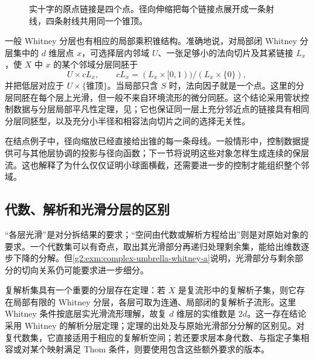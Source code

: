 \begin{figure}[htbp]
	\centering
	
	\caption{实十字的原点链接是四个点。径向伸缩把每个链接点展开成一条射线，四条射线共用同一个锥顶。}
	\label{g2:fig:cross-link}
\end{figure}

一般 Whitney 分层也有相应的局部乘积锥结构。准确地说，对局部闭 Whitney 分层集中的 \(d\) 维层点 \(x\)，可选择层内邻域 \(U\)、一张足够小的法向切片及其紧链接 \(L_x\)，使 \(X\) 中 \(x\) 的某个邻域分层同胚于
\[
	U\times cL_x,\qquad
	cL_x=(L_x\times[0,1))/(L_x\times\{0\}),
\]
并把低层对应于 \(U\times\{\text{锥顶}\}\)。当局部只含 \(S\) 时，法向因子就是一个点。这里的分层同胚在每个层上光滑，但一般不来自环境流形的微分同胚。这个结论采用管状控制数据与分层局部平凡性定理，见\cite[第7节及第10节的管邻域局部平凡性]{Mather2012TopologicalStability}；它也保证同一层上充分邻近点的链接具有相同分层同胚型，以及充分小半径和相容法向切片之间的选择无关性。

\ProseParagraphBreak

在结点例子中，径向缩放已经直接给出锥的每一条母线。一般情形中，控制数据提供可与其他层协调的投影与径向函数；下一节将说明这些对象怎样生成连续的保层流。这也解释了为什么仅仅证明小球面横截，还需要进一步的控制才能组织整个邻域。

\subsection{代数、解析和光滑分层的区别}
\label{g2:subsec:B01:04}

“各层光滑”是对分拆结果的要求；“空间由代数或解析方程给出”则是对原始对象的要求。一个代数集可以有奇点，取出其光滑部分再递归处理剩余集，能给出维数逐步下降的分解。但\cref{g2:exm:complex-umbrella-whitney-a}说明，光滑部分与剩余部分的切向关系仍可能要求进一步细分。

\ProseParagraphBreak

复解析集具有一个重要的分层存在定理：若 \(X\) 是复流形中的复解析子集，则它存在局部有限的 Whitney 分层，各层可取为连通、局部闭的复解析子流形。这里 Whitney 条件按底层实光滑流形理解，故复 \(d\) 维层的实维数是 \(2d\)。这一存在结论采用 Whitney 的解析分层定理；定理的出处及与原始光滑部分分解的区别见\cite[第470页]{Goresky2012StratificationIntroduction}。对复代数集，它直接适用于相应的复解析空间；若还要求层本身代数、与指定子集相容或对某个映射满足 Thom 条件，则要使用包含这些额外要求的版本。

